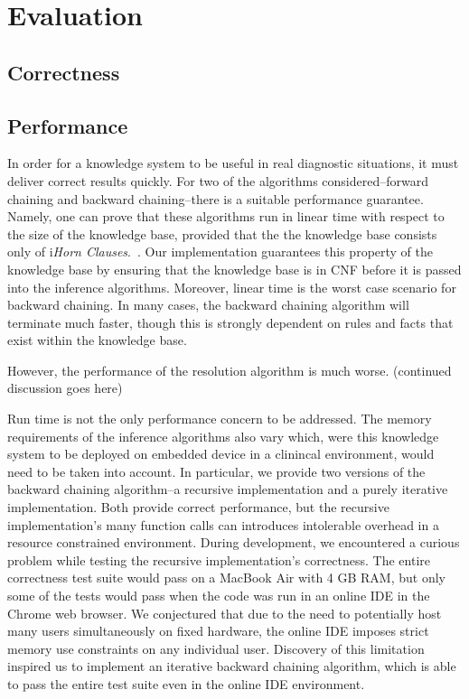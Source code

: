 \documentclass[12pt, conference, compsocconf]{IEEEtran}
\begin{document}
\section{Evaluation}

\subsection{Correctness}

\subsection{Performance}
In order for a knowledge system to be useful in real diagnostic situations, it must deliver correct results quickly. 
For two of the algorithms considered--forward chaining and backward chaining--there is a suitable performance guarantee. 
Namely, one can prove that these algorithms run in linear time with respect to the size of the knowledge base, provided that the the knowledge base consists only of i\emph{Horn Clauses}.~\cite{russell-norvig-aima}. 
Our implementation guarantees this property of the knowledge base by ensuring that the knowledge base is in CNF before it is passed into the inference algorithms. 
Moreover, linear time is the worst case scenario for backward chaining. 
In many cases, the backward chaining algorithm will terminate much faster, though this is strongly dependent on rules and facts that exist within the knowledge base. 

However, the performance of the resolution algorithm is much worse. (continued discussion goes here)

Run time is not the only performance concern to be addressed. 
The memory requirements of the inference algorithms also vary which, were this knowledge system to be deployed on embedded device in a clinincal environment, would need to be taken into account. 
In particular, we provide two versions of the backward chaining algorithm--a recursive implementation and a purely iterative implementation. 
Both provide correct performance, but the recursive implementation's many function calls can introduces intolerable overhead in a resource constrained environment. 
During development, we encountered a curious problem while testing the recursive implementation's correctness.
The entire correctness test suite would pass on a MacBook Air with 4 GB RAM, but only some of the tests would pass when the code was run in an online IDE in the Chrome web browser.
We conjectured that due to the need to potentially host many users simultaneously on fixed hardware, the online IDE imposes strict memory use constraints on any individual user. 
Discovery of this limitation inspired us to implement an iterative backward chaining algorithm, which is able to pass the entire test suite even in the online IDE environment. 
\end{document}
